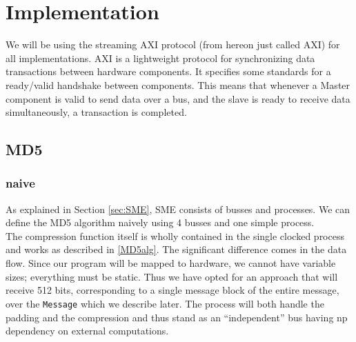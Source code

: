 \documentclass[a4paper]{article}
\begin{document}
\section{Implementation}
\label{sec:org61b33db}

We will be using the streaming AXI protocol (from hereon just called AXI) for all implementations. AXI is a lightweight protocol for synchronizing data transactions between hardware components. It specifies some standards for a ready/valid handshake between components. This means that whenever a Master component is valid to send data over a bus, and the slave is ready to receive data simultaneously, a transaction is completed.
\subsection{MD5}
\label{sec:orgffea120}
\subsubsection{naive}
\label{MD5naive}
As explained in Section \ref{sec:SME}, SME consists of busses and processes. We can define the MD5 algorithm naively using 4 busses and one simple process.\\

The compression function itself is wholly contained in the single clocked process and works as described in \ref{MD5alg}. The significant difference comes in the data flow. Since our program will be mapped to hardware, we cannot have variable sizes; everything must be static. Thus we have opted for an approach that will receive 512 bits, corresponding to a single message block of the entire message, over the \texttt{Message} which we describe later. The process will both handle the padding and the compression and thus stand as an ``independent'' bus having np dependency on external computations.
\end{document}
